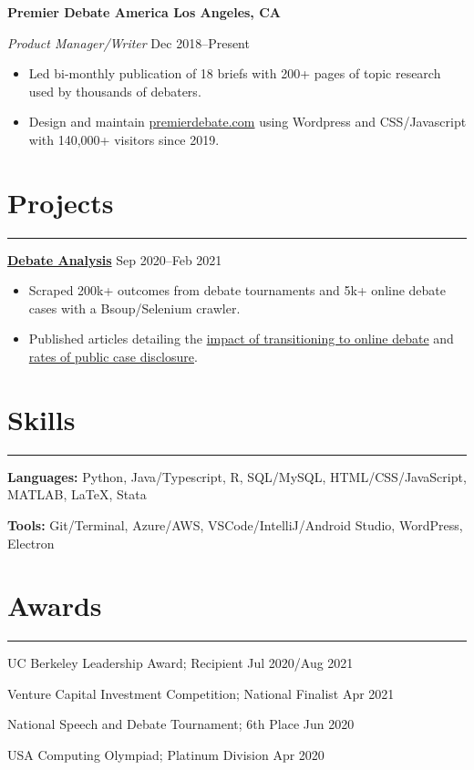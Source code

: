 \documentclass[11pt]{article}
\newcommand{\resumesection}[1]{\vspace{-0.8cm}\section*{\color{highlight}#1}\vspace{-0.3cm}\hrule\vspace{0.2cm}}
\begin{document}
\textbf{Premier Debate America \hfill  Los Angeles, CA} \par
\textit{Product Manager/Writer} \hfill Dec 2018--Present \par
\begin{itemize}
	\item Led bi-monthly publication of 18 briefs with 200+ pages of topic research used by thousands of debaters.
	\item Design and maintain \href{https://www.premierdebate.com/briefs/}{premierdebate.com} using Wordpress and CSS/Javascript with 140,000+ visitors since 2019.
\end{itemize}

\resumesection{Projects}

\textbf{\href{https://github.com/petezh/E-Debate}{Debate Analysis}} \hfill Sep 2020--Feb 2021\par
\begin{itemize}
	\item Scraped 200k+ outcomes from debate tournaments and 5k+ online debate cases with a Bsoup/Selenium crawler.
	\item Published articles detailing the \href{https://www.vbriefly.com/2020/12/31/five-trends-among-e-debate-competitors-by-peter-zhang/}{impact of transitioning to online debate} and \href{https://www.vbriefly.com/2021/01/22/disclosure-in-numbers-by-peter-zhang/}{rates of public case disclosure}.
\end{itemize}\vspace{0.1cm} \par

\resumesection{Skills}

\textbf{Languages:} Python, Java/Typescript, R, SQL/MySQL, HTML/CSS/JavaScript, MATLAB, \LaTeX, Stata \par
\textbf{Tools:} Git/Terminal, Azure/AWS, VSCode/IntelliJ/Android Studio, WordPress, Electron

\resumesection{Awards}

UC Berkeley Leadership Award; Recipient \hfill Jul 2020/Aug 2021 \par
Venture Capital Investment Competition; National Finalist \hfill Apr 2021\par
National Speech and Debate Tournament; 6th Place \hfill Jun 2020 \par
USA Computing Olympiad; Platinum Division \hfill Apr 2020 \par
\end{document}
